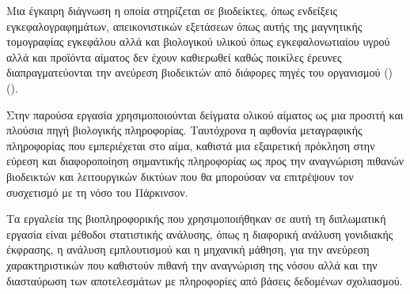 \documentclass[12pt]{article}
\begin{document}
\begin{spacing}{1.5}
            \par
                Μια έγκαιρη διάγνωση η οποία στηρίζεται σε βιοδείκτες, όπως ενδείξεις εγκεφαλογραφημάτων, απεικονιστικών εξετάσεων όπως αυτής της μαγνητικής τομογραφίας εγκεφάλου αλλά και βιολογικού υλικού όπως εγκεφαλονωτιαίου υγρού αλλά και προϊόντα αίματος δεν έχουν καθιερωθεί καθώς ποικίλες έρευνες διαπραγματεύονται την ανεύρεση βιοδεικτών από διάφορες πηγές του οργανισμού (\emph{\cite{Miller2015BiomarkersFuture}}) (\emph{\cite{Maitin2022SurveyReview}}).
            \par
                Στην παρούσα εργασία χρησιμοποιούνται δείγματα ολικού αίματος ως μια προσιτή και πλούσια πηγή βιολογικής πληροφορίας. Ταυτόχρονα η αφθονία μεταγραφικής πληροφορίας που εμπεριέχεται στο αίμα, καθιστά μια εξαιρετική πρόκληση στην εύρεση και διαφοροποίηση σημαντικής πληροφορίας ως προς την αναγνώριση πιθανών βιοδεικτών και λειτουργικών δικτύων που θα μπορούσαν να επιτρέψουν τον συσχετισμό με τη νόσο του Πάρκινσον.
            \par
                Τα εργαλεία της βιοπληροφορικής που χρησιμοποιήθηκαν σε αυτή τη διπλωματική εργασία είναι μέθοδοι στατιστικής ανάλυσης, όπως η διαφορική ανάλυση γονιδιακής έκφρασης, η ανάλυση εμπλουτισμού και η μηχανική μάθηση, για την ανεύρεση χαρακτηριστικών που καθιστούν πιθανή την αναγνώριση της νόσου αλλά και την διασταύρωση των αποτελεσμάτων με πληροφορίες από βάσεις δεδομένων σχολιασμού.
        \end{spacing}
        \newpage
\end{document}
